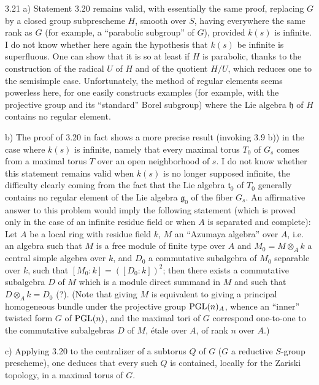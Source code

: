 \begin{remarks}{3.21}\label{XIV.3.21}
\noindent a) Statement
3.20 remains valid,
with essentially the
same proof, replacing
$G$ by a closed group
subprescheme $H$,
smooth over $S$,
having everywhere
the same rank as $G$
(for example, a
``parabolic subgroup''
of $G$), provided
$k(s)$ is infinite.
I do not know whether
here again the
hypothesis that
$k(s)$ be infinite
is superfluous.
One can show that
it is so at least
if $H$ is parabolic,
thanks to the
construction of the
radical $U$ of $H$
and of the quotient
$H/U$, which reduces
one to the semisimple
case. Unfortunately,
the method of regular
elements seems powerless
here, for one easily
constructs examples
(for example, with
the projective group
and its ``standard''
Borel subgroup) where
the Lie algebra
$\mathfrak h$ of $H$
contains no regular
element.

\noindent b) The
proof of 3.20 in
fact shows a more
precise result
(invoking 3.9 b))
in the case where
$k(s)$ is infinite,
namely that every
maximal torus $T_0$
of $G_s$ comes from
a maximal torus $T$
over an open
neighborhood of $s$.
I do not know whether
this statement remains
valid when $k(s)$
is no longer supposed
infinite, the difficulty
clearly coming from
the fact that the
Lie algebra
$\mathfrak t_0$ of
$T_0$ generally
contains no regular
element of the
Lie algebra
$\mathfrak g_0$ of
the fiber $G_s$.
An affirmative answer
to this problem would
imply the following
statement (which is
proved only in the
case of an infinite
residue field or when
$A$ is separated and
complete): Let $A$
be a local ring
with residue field
$k$, $M$ an ``Azumaya
algebra'' over $A$,
i.e. an algebra
such that $M$ is
a free module of
finite type over $A$
and $M_0=M\otimes_A k$
a central simple
algebra over $k$,
and $D_0$ a
commutative subalgebra
of $M_0$ separable
over $k$, such that
$[M_0:k]=([D_0:k])^2$;
then there exists
a commutative
subalgebra $D$ of
$M$ which is a
module direct summand
in $M$ and such
that $D\otimes_A k=D_0$
(?). (Note that
giving $M$ is
equivalent to giving
a principal homogeneous
bundle under the
projective group
$\operatorname{PGL}(n)_A$, whence
an ``inner'' twisted
form $G$ of $\operatorname{PGL}(n)$,
and the maximal tori
of $G$ correspond
one-to-one to the
commutative subalgebras
$D$ of $M$, \'etale
over $A$, of rank
$n$ over $A$.)

\noindent c) Applying
3.20 to the
centralizer of a
subtorus $Q$ of $G$
($G$ a reductive
$S$-group prescheme),
one deduces that
every such $Q$ is
contained, locally
for the Zariski
topology, in a
maximal torus of $G$.
\end{remarks}


